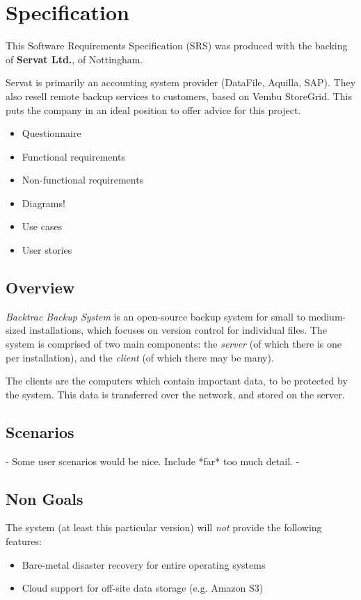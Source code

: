 \chapter{Specification}

This Software Requirements Specification (SRS) was produced with the backing of
\textbf{Servat Ltd.}, of Nottingham.

Servat is primarily an accounting system provider (DataFile, Aquilla, SAP).
They also resell remote backup services to customers, based on Vembu StoreGrid.
This puts the company in an ideal position to offer advice for this project.

\begin{itemize}
    \item Questionnaire
    \item Functional requirements
    \item Non-functional requirements
    \item Diagrams!
    \item Use cases
    \item User stories
\end{itemize}

\section{Overview}

\emph{Backtrac Backup System} is an open-source backup system for small to
medium-sized installations, which focuses on version control for individual
files. The system is comprised of two main components: the \emph{server} (of
which there is one per installation), and the \emph{client} (of which there
may be many).

The clients are the computers which contain important data, to be
protected by the system. This data is transferred over the network, and stored
on the server.

\section{Scenarios}

 - Some user scenarios would be nice. Include *far* too much detail. -

\section{Non Goals}

The system (at least this particular version) will \emph{not} provide the
following features:

\begin{itemize}
    \item Bare-metal disaster recovery for entire operating systems
    \item Cloud support for off-site data storage (e.g. Amazon S3)
\end{itemize}
